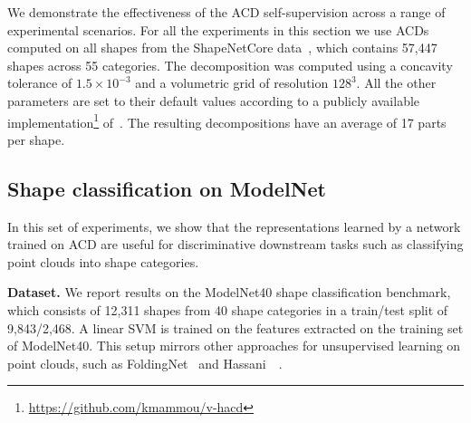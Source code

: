 
We demonstrate the effectiveness of the ACD self-supervision across a range of experimental scenarios. 
For all the experiments in this section we use ACDs computed on all shapes from the ShapeNetCore data~\cite{Chang2015ShapeNetAI},
which contains 57,447 shapes across 55 categories.
The decomposition was computed using a concavity tolerance of $1.5 \times 10^{-3}$ and a volumetric
grid of resolution $128^3$.
All the other parameters are set to their default values according to a 
publicly available implementation\footnote{\url{https://github.com/kmammou/v-hacd}} of~\cite{vhacd}.
The resulting decompositions have an average of 17 parts per shape.


\subsection{Shape classification on ModelNet}
In this set of experiments, we show that the representations learned by a network trained on ACD are useful for discriminative downstream tasks such as classifying point clouds into shape categories. 




\vspace{2mm}
\noindent
\textbf{Dataset.} We report results on the ModelNet40 shape classification benchmark, which consists of 12,311 shapes from 40 shape categories in a train/test split of 9,843/2,468. A linear SVM is trained on the features extracted on the training set of ModelNet40. 
This setup mirrors other approaches for unsupervised learning on point clouds, such as FoldingNet~\cite{yang2018foldingnet} and Hassani~\etal~\cite{hassani2019unsupervised}.

